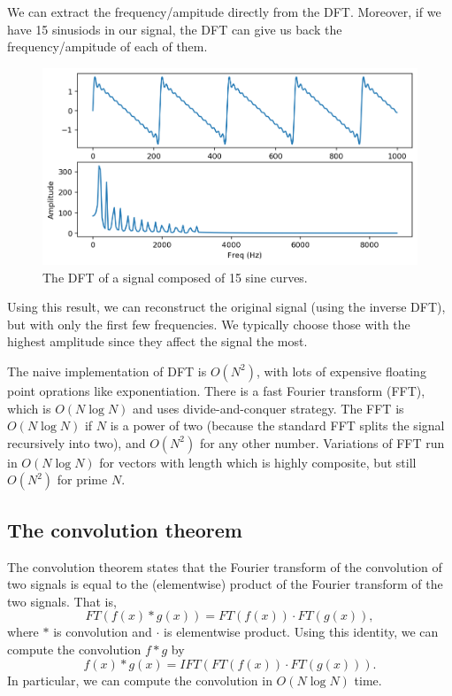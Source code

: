\documentclass[a4paper, openany]{memoir}
\begin{document}
\noindent We can extract the frequency/ampitude directly from the DFT. Moreover, if we have 15 sinusiods in our signal, the DFT can give us back the frequency/ampitude of each of them.
\begin{figure}[H]
    \centering
    \includegraphics[scale=0.5]{src/6.24 15 sine curves fourier.png}
    \caption{The DFT of a signal composed of 15 sine curves.}
\end{figure}
\noindent Using this result, we can reconstruct the original signal (using the inverse DFT), but with only the first few frequencies. We typically choose those with the highest amplitude since they affect the signal the most.

The naive implementation of DFT is $O(N^2)$, with lots of expensive floating point oprations like exponentiation. There is a fast Fourier transform (FFT), which is $O(N \log N)$ and uses divide-and-conquer strategy. The FFT is $O(N \log N)$ if $N$ is a power of two (because the standard FFT splits the signal recursively into two), and $O(N^2)$ for any other number. Variations of FFT run in $O(N \log N)$ for vectors with length which is highly composite, but still $O(N^2)$ for prime $N$.

\subsection{The convolution theorem}
The convolution theorem states that the Fourier transform of the convolution of two signals is equal to the (elementwise) product of the Fourier transform of the two signals. That is,
\[FT(f(x) * g(x)) = FT(f(x)) \cdot FT(g(x)),\]
where $*$ is convolution and $\cdot$ is elementwise product. Using this identity, we can compute the convolution $f * g$ by
\[f(x) * g(x) = IFT(FT(f(x)) \cdot FT(g(x))).\]
In particular, we can compute the convolution in $O(N \log N)$ time.
\end{document}
